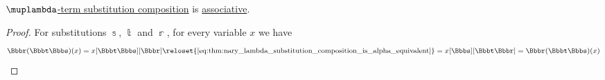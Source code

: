 \begin{corollary}\label{thm:lambda_substitution_composition_associative}
  \hyperref[def:lambda_substitution_composition]{\( \muplambda \)-term substitution composition} is \hyperref[def:binary_operation/associative]{associative}.
\end{corollary}
\begin{proof}
  For substitutions \( \Bbbs \), \( \Bbbt \) and \( \Bbbr \), for every variable \( x \) we have
  \begin{equation*}
    \Bbbr(\Bbbt\Bbbs)(x)
    =
    x[\Bbbt\Bbbs][\Bbbr]
    \reloset {\eqref{eq:thm:nary_lambda_substitution_composition_is_alpha_equivalent}} =
    x[\Bbbs][\Bbbt\Bbbr]
    =
    \Bbbr(\Bbbt\Bbbs)(x)
  \end{equation*}
\end{proof}


